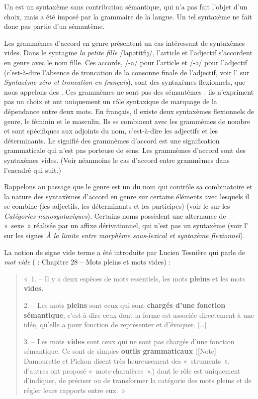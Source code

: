 {Un  est un syntaxème sans contribution sémantique, qui n’a pas fait l’objet d’un choix, mais a été imposé par la grammaire de la langue. Un tel syntaxème ne fait donc pas partie d’un sémantème.}

\begin{sloppypar}
Les grammèmes d’accord en genre présentent un cas intéressant de syntaxèmes vides. Dans le syntagme \textit{la petite fille} /lapətitfij/, l’article et l’adjectif s’accordent en genre avec le nom fille. Ces accords, /-a/ pour l’article et /-ə/ pour l’adjectif (c’est-à-dire l’absence de troncation de la consonne finale de l’adjectif, voir l’ sur \textit{Syntaxème zéro et troncation en français}), sont des syntaxèmes flexionnels, que nous appelons des . Ces grammèmes ne sont pas des sémantèmes : ils n’expriment pas un choix et ont uniquement un rôle syntaxique de marquage de la dépendance entre deux mots. En français, il existe deux syntaxèmes flexionnels de genre, le féminin et le masculin. Ils se combinent avec les grammèmes de nombre et sont spécifiques aux adjoints du nom, c’est-à-dire les adjectifs et les déterminants. Le signifié des grammèmes d’accord est une signification grammaticale qui n’est pas porteuse de sens. Les grammèmes d’accord sont des syntaxèmes vides. (Voir néanmoins le cas d’accord entre grammèmes dans l’encadré qui suit.)
\end{sloppypar}

Rappelons au passage que le genre est un  du nom qui contrôle sa combinatoire et la nature des syntaxèmes d’accord en genre sur certains éléments avec lesquels il se combine (les adjectifs, les déterminants et les participes) (voir le  sur les \textit{Catégories nanosyntaxiques}). Certains noms possèdent une alternance de «~sexe~» réalisée par un affixe dérivationnel, qui n’est pas un syntaxème (voir l’ sur les signes \textit{À la limite entre morphème sous-lexical et syntaxème flexionnel}).

La notion de signe vide terme a été introduite par Lucien Tesnière qui parle de \textit{mot vide} (\citeyear{tesniere1959elements} : Chapitre 28 – Mots pleins et mots vides) :
\begin{quote}
    «~1. – Il y a deux espèces de mots essentiels, les mots \textbf{pleins} et les mots \textbf{vides}.

    2. – Les mots \textbf{pleins} sont ceux qui sont \textbf{chargés d’une} \textbf{fonction sémantique}, c’est-à-dire ceux dont la forme est associée directement à une idée, qu’elle a pour fonction de représenter et d’évoquer. […]

    3. – Les mots \textbf{vides} sont ceux qui ne sont pas chargés d’une fonction sémantique. Ce sont de simples \textbf{outils grammaticaux} ([Note] Damourette et Pichon disent très heureusement des «~struments~», d’autres ont proposé «~mots-charnières~».) dont le rôle est uniquement d’indiquer, de préciser ou de transformer la catégorie des mots pleins et de régler leurs rapports entre eux.~»
\end{quote}

